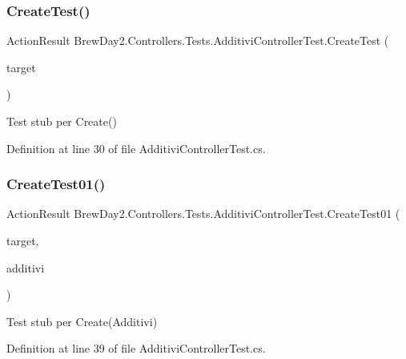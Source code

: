 \subsubsection{\texorpdfstring{Create\+Test()}{CreateTest()}}
{\footnotesize\ttfamily Action\+Result Brew\+Day2.\+Controllers.\+Tests.\+Additivi\+Controller\+Test.\+Create\+Test (\begin{DoxyParamCaption}\item[{\mbox{[}\+Pex\+Assume\+Under\+Test\mbox{]} \mbox{\hyperlink{class_brew_day2_1_1_controllers_1_1_additivi_controller}{Additivi\+Controller}}}]{target }\end{DoxyParamCaption})}



Test stub per Create()



Definition at line 30 of file Additivi\+Controller\+Test.\+cs.

\mbox{\label{class_brew_day2_1_1_controllers_1_1_tests_1_1_additivi_controller_test_aa1296601853176cf8697a69906673e06}} 
\subsubsection{\texorpdfstring{Create\+Test01()}{CreateTest01()}}
{\footnotesize\ttfamily Action\+Result Brew\+Day2.\+Controllers.\+Tests.\+Additivi\+Controller\+Test.\+Create\+Test01 (\begin{DoxyParamCaption}\item[{\mbox{[}\+Pex\+Assume\+Under\+Test\mbox{]} \mbox{\hyperlink{class_brew_day2_1_1_controllers_1_1_additivi_controller}{Additivi\+Controller}}}]{target,  }\item[{\mbox{\hyperlink{class_brew_day2_1_1_models_1_1_additivi}{Additivi}}}]{additivi }\end{DoxyParamCaption})}



Test stub per Create(\+Additivi)



Definition at line 39 of file Additivi\+Controller\+Test.\+cs.

